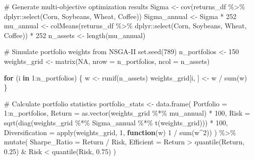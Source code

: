\documentclass[
  10pt,
  a4paper,
]{article}
\newenvironment{Shaded}{\begin{snugshade}}{\end{snugshade}}
\newcommand{\AttributeTok}[1]{\textcolor[rgb]{0.40,0.45,0.13}{#1}}
\newcommand{\CommentTok}[1]{\textcolor[rgb]{0.37,0.37,0.37}{#1}}
\newcommand{\ConstantTok}[1]{\textcolor[rgb]{0.56,0.35,0.01}{#1}}
\newcommand{\ControlFlowTok}[1]{\textcolor[rgb]{0.00,0.23,0.31}{\textbf{#1}}}
\newcommand{\DecValTok}[1]{\textcolor[rgb]{0.68,0.00,0.00}{#1}}
\newcommand{\FloatTok}[1]{\textcolor[rgb]{0.68,0.00,0.00}{#1}}
\newcommand{\FunctionTok}[1]{\textcolor[rgb]{0.28,0.35,0.67}{#1}}
\newcommand{\NormalTok}[1]{\textcolor[rgb]{0.00,0.23,0.31}{#1}}
\newcommand{\OtherTok}[1]{\textcolor[rgb]{0.00,0.23,0.31}{#1}}
\newcommand{\SpecialCharTok}[1]{\textcolor[rgb]{0.37,0.37,0.37}{#1}}
\begin{document}
\begin{Shaded}
\begin{Highlighting}[]
\CommentTok{\# Generate multi{-}objective optimization results}
\NormalTok{Sigma }\OtherTok{\textless{}{-}} \FunctionTok{cov}\NormalTok{(returns\_df }\SpecialCharTok{\%\textgreater{}\%}\NormalTok{ dplyr}\SpecialCharTok{::}\FunctionTok{select}\NormalTok{(Corn, Soybeans, Wheat, Coffee))}
\NormalTok{Sigma\_annual }\OtherTok{\textless{}{-}}\NormalTok{ Sigma }\SpecialCharTok{*} \DecValTok{252}
\NormalTok{mu\_annual }\OtherTok{\textless{}{-}} \FunctionTok{colMeans}\NormalTok{(returns\_df }\SpecialCharTok{\%\textgreater{}\%}\NormalTok{ dplyr}\SpecialCharTok{::}\FunctionTok{select}\NormalTok{(Corn, Soybeans, Wheat, Coffee)) }\SpecialCharTok{*} \DecValTok{252}
\NormalTok{n\_assets }\OtherTok{\textless{}{-}} \FunctionTok{length}\NormalTok{(mu\_annual)}

\CommentTok{\# Simulate portfolio weights from NSGA{-}II}
\FunctionTok{set.seed}\NormalTok{(}\DecValTok{789}\NormalTok{)}
\NormalTok{n\_portfolios }\OtherTok{\textless{}{-}} \DecValTok{150}
\NormalTok{weights\_grid }\OtherTok{\textless{}{-}} \FunctionTok{matrix}\NormalTok{(}\ConstantTok{NA}\NormalTok{, }\AttributeTok{nrow =}\NormalTok{ n\_portfolios, }\AttributeTok{ncol =}\NormalTok{ n\_assets)}

\ControlFlowTok{for}\NormalTok{ (i }\ControlFlowTok{in} \DecValTok{1}\SpecialCharTok{:}\NormalTok{n\_portfolios) \{}
\NormalTok{  w }\OtherTok{\textless{}{-}} \FunctionTok{runif}\NormalTok{(n\_assets)}
\NormalTok{  weights\_grid[i, ] }\OtherTok{\textless{}{-}}\NormalTok{ w }\SpecialCharTok{/} \FunctionTok{sum}\NormalTok{(w)}
\NormalTok{\}}

\CommentTok{\# Calculate portfolio statistics}
\NormalTok{portfolio\_stats }\OtherTok{\textless{}{-}} \FunctionTok{data.frame}\NormalTok{(}
  \AttributeTok{Portfolio =} \DecValTok{1}\SpecialCharTok{:}\NormalTok{n\_portfolios,}
  \AttributeTok{Return =} \FunctionTok{as.vector}\NormalTok{(weights\_grid }\SpecialCharTok{\%*\%}\NormalTok{ mu\_annual) }\SpecialCharTok{*} \DecValTok{100}\NormalTok{,}
  \AttributeTok{Risk =} \FunctionTok{sqrt}\NormalTok{(}\FunctionTok{diag}\NormalTok{(weights\_grid }\SpecialCharTok{\%*\%}\NormalTok{ Sigma\_annual }\SpecialCharTok{\%*\%} \FunctionTok{t}\NormalTok{(weights\_grid))) }\SpecialCharTok{*} \DecValTok{100}\NormalTok{,}
  \AttributeTok{Diversification =} \FunctionTok{apply}\NormalTok{(weights\_grid, }\DecValTok{1}\NormalTok{, }\ControlFlowTok{function}\NormalTok{(w) }\DecValTok{1} \SpecialCharTok{/} \FunctionTok{sum}\NormalTok{(w}\SpecialCharTok{\^{}}\DecValTok{2}\NormalTok{))}
\NormalTok{) }\SpecialCharTok{\%\textgreater{}\%}
  \FunctionTok{mutate}\NormalTok{(}
    \AttributeTok{Sharpe\_Ratio =}\NormalTok{ Return }\SpecialCharTok{/}\NormalTok{ Risk,}
    \AttributeTok{Efficient =}\NormalTok{ Return }\SpecialCharTok{\textgreater{}} \FunctionTok{quantile}\NormalTok{(Return, }\FloatTok{0.25}\NormalTok{) }\SpecialCharTok{\&}\NormalTok{ Risk }\SpecialCharTok{\textless{}} \FunctionTok{quantile}\NormalTok{(Risk, }\FloatTok{0.75}\NormalTok{)}
\NormalTok{  )}


\end{Highlighting}
\end{Shaded}
\end{document}
